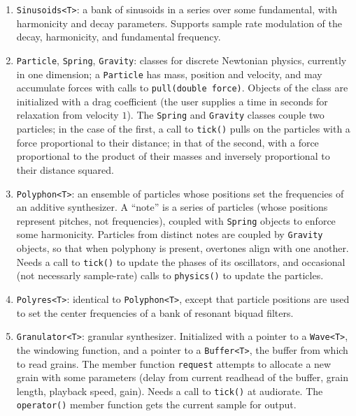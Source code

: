 \documentclass{amsart}
\newcommand{\1}{\mathbf{1}}
\begin{document}
\begin{enumerate}
  \item \texttt{Sinusoids<T>}: a bank of sinusoids in a series over some fundamental, with harmonicity and decay parameters. Supports sample rate modulation of the decay, harmonicity, and fundamental frequency.
  
  \item \texttt{Particle}, \texttt{Spring}, \texttt{Gravity}: classes for discrete Newtonian physics, currently in one dimension; a \texttt{Particle} has mass, position and velocity, and may accumulate forces with calls to \texttt{pull(double force)}. Objects of the class are initialized with a drag coefficient (the user supplies a time in seconds for relaxation from velocity $1$). The \texttt{Spring} and \texttt{Gravity} classes couple two particles; in the case of the first, a call to \texttt{tick()} pulls on the particles with a force proportional to their distance; in that of the second, with a force proportional to the product of their masses and inversely proportional to their distance squared. 
  
  \item \texttt{Polyphon<T>}: an ensemble of particles whose positions set the frequencies of an additive synthesizer. A ``note'' is a series of particles (whose positions represent pitches, not frequencies), coupled with \texttt{Spring} objects to enforce some harmonicity. Particles from distinct notes are coupled by \texttt{Gravity} objects, so that when polyphony is present, overtones align with one another. Needs a call to \texttt{tick()} to update the phases of its oscillators, and occasional (not necessarly sample-rate) calls to \texttt{physics()} to update the particles. 
  
  \item \texttt{Polyres<T>}: identical to \texttt{Polyphon<T>}, except that particle positions are used to set the center frequencies of a bank of resonant biquad filters. 
  
  \item \texttt{Granulator<T>}: granular synthesizer. Initialized with a pointer to a \texttt{Wave<T>}, the windowing function, and a pointer to a \texttt{Buffer<T>}, the buffer from which to read grains. The member function \texttt{request} attempts to allocate a new grain with some parameters (delay from current readhead of the buffer, grain length, playback speed, gain). Needs a call to \texttt{tick()} at audiorate. The \texttt{operator()} member function gets the current sample for output. 
  \end{enumerate} 
\end{document}
